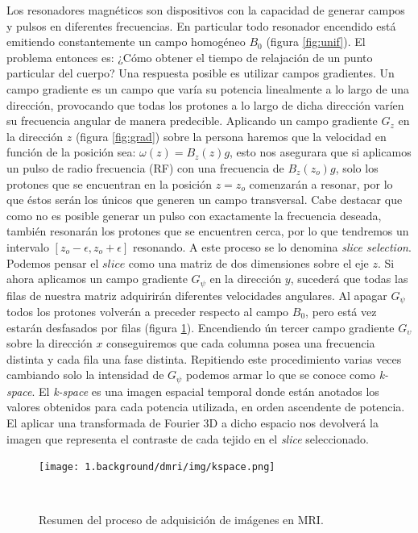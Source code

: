 Los resonadores magn\'eticos son dispositivos con la capacidad de generar 
campos y pulsos en diferentes frecuencias. En particular todo resonador
encendido est\'a emitiendo constantemente un campo homog\'eneo $B_0$
(figura \ref{fig:unif}). El problema entonces es: ¿C\'omo obtener el tiempo
de relajaci\'on de un punto particular del cuerpo? Una respuesta posible
es utilizar campos gradientes. Un campo gradiente es un campo que var\'ia
su potencia linealmente a lo largo de una direcci\'on, provocando que todas
los protones a lo largo de dicha direcci\'on var\'ien su frecuencia
angular de manera predecible. Aplicando un campo gradiente $G_z$ en la
direcci\'on $z$ (figura \ref{fig:grad}) sobre la persona haremos que la
velocidad en funci\'on de la posici\'on sea: $\omega(z) = B_z(z) g$, esto
nos asegurara que si aplicamos un pulso de radio frecuencia (RF) con una
frecuencia de $B_z(z_o) g$, solo los protones que se encuentran en la
posici\'on $z=z_o$ comenzar\'an a resonar, por lo que \'estos ser\'an los
\'unicos que generen un campo transversal. Cabe destacar que como no es
posible generar un pulso con exactamente la frecuencia deseada, tambi\'en
resonar\'an los protones que se encuentren cerca, por lo que tendremos un
intervalo $[z_o-\epsilon,z_o+\epsilon]$ resonando. A este proceso se lo
denomina \textit{slice selection}. Podemos pensar el $slice$ como una
matriz
de dos dimensiones sobre el eje $z$. Si ahora aplicamos un campo gradiente
$G_\psi$ en la direcci\'on $y$, suceder\'a que todas las  filas de nuestra
matriz adquirir\'an diferentes velocidades angulares. Al apagar $G_\psi$
todos los protones volver\'an a preceder respecto al campo $B_0$, pero est\'a
vez estar\'an desfasados por filas (figura \ref{fig:kspace}). Encendiendo 
\'un tercer campo gradiente $G_\upsilon$ sobre la direcci\'on $x$
conseguiremos que cada columna posea una frecuencia distinta y cada fila
una fase distinta. Repitiendo este procedimiento varias veces cambiando
solo la intensidad de $G_\psi$ podemos armar lo que se conoce como 
\textit{k-space}. El \textit{k-space} es una imagen espacial temporal
donde est\'an anotados los valores obtenidos para cada potencia utilizada,
en orden ascendente de potencia. El aplicar una transformada de Fourier 3D
a dicho espacio nos devolver\'a la imagen que representa el contraste de
cada tejido en el \textit{slice} seleccionado. \\

\begin{figure}[h!]
                                                                                                                        
\begin{minipage}[b]{\textwidth}
    \texttt{[image: 1.background/dmri/img/kspace.png]}
    \caption{Resumen del proceso de adquisici\'on de im\'agenes en MRI.}
    \label{fig:kspace}
\end{minipage} ~

\end{figure}  



